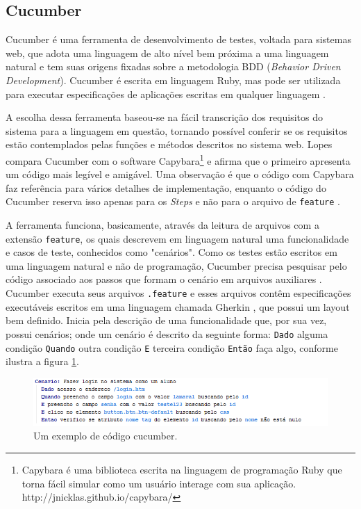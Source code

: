 \documentclass[tg]{mdtufsm}
\begin{document}
\subsection{Cucumber}
Cucumber é uma ferramenta de desenvolvimento de testes, voltada para sistemas web, que adota uma linguagem de alto nível bem próxima a uma linguagem natural e tem suas origens fixadas sobre a metodologia BDD (\emph{Behavior Driven Development}). Cucumber
é escrita em linguagem Ruby, mas pode ser utilizada para executar especificações de aplicações escritas em qualquer linguagem \cite{nunescucumber}.

A escolha dessa ferramenta baseou-se na fácil transcrição dos requisitos do sistema para a linguagem em questão, tornando possível conferir se os requisitos estão contemplados pelas funções e métodos descritos no sistema web.
Lopes \citeyearpar{lopescucumbervalor} compara Cucumber com o software Capybara\footnote{Capybara é uma biblioteca escrita na linguagem de programação Ruby que torna fácil simular como um usuário interage com sua aplicação. http://jnicklas.github.io/capybara/} e afirma que o primeiro apresenta um código mais legível e amigável. Uma observação é que o código com Capybara faz
referência para vários detalhes de implementação, enquanto o código do Cucumber reserva isso apenas para os \emph{Steps} e não para o arquivo de \texttt{feature} \cite{lopescucumbervalor}.

A ferramenta funciona, basicamente, através da leitura de arquivos com a extensão \texttt{feature}, os quais descrevem em linguagem natural uma funcionalidade e casos de teste, conhecidos como "cenários". Como os testes estão escritos em uma linguagem natural e não de programação, Cucumber precisa pesquisar pelo código associado aos passos que formam o cenário em arquivos auxiliares \cite{scmitzcucumberreview}. Cucumber
executa seus arquivos \texttt{.feature} e esses arquivos contêm especificações executáveis escritos em uma linguagem chamada Gherkin \cite{cucumberwiki}, que possui um layout bem definido. Inicia pela descrição de uma funcionalidade
que, por sua vez, possui cenários; onde um cenário é descrito da seguinte forma: \texttt{Dado} alguma condição \texttt{Quando} outra condição \texttt{E} terceira condição \texttt{Então} faça algo, conforme ilustra a figura \ref{fig:codigo_cucumber}.

\begin{figure}[!htb]
	\centering
	\includegraphics[width=1.1
	\textwidth]{codigo_cucumber}
	\caption{Um exemplo de código cucumber.}
	\label{fig:codigo_cucumber}
\end{figure}
\end{document}
